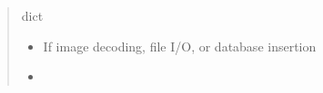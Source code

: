 \documentclass[letterpaper,10pt,english]{sphinxmanual}
\begin{document}
\begin{fulllineitems}
\begin{quote}
\begin{description}
\sphinxAtStartPar
dict

\begin{itemize}
\item {} 
\sphinxAtStartPar
{} \textendash{} If image decoding, file I/O, or database insertion

\item {} 
\sphinxAtStartPar
{} \textendash{} 

\end{itemize}

\end{description}\end{quote}

\end{fulllineitems}

\end{document}
